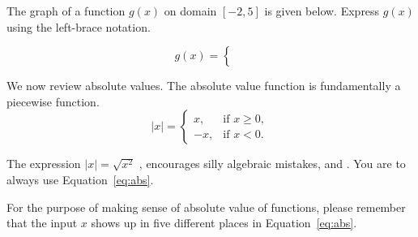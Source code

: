 \documentclass[../main.tex]{subfiles}
\begin{document}
\begin{exercise}
  The graph of a function \(g(x)\) on domain \([-2,5]\) is given below. Express \(g(x)\) using the left-brace notation.

  \begin{minipage}{3in}
  \end{minipage}
  \begin{minipage}{2in}
    \[
      g(x) = 
      \begin{cases}
        \phantom{a} \\[10ex]
        \phantom{a}
      \end{cases}
    \]
  \end{minipage}
\end{exercise}

\clearpage

We now review absolute values. The absolute value function is fundamentally a piecewise function.
\begin{equation} \label{eq:abs}
  |x| = 
  \begin{cases}
    x, &\text{if } x \ge 0, \\
    -x, &\text{if } x < 0.
  \end{cases}
\end{equation}

\faExclamationTriangle{} The expression \(|x| = \sqrt{x^{2}}\) , encourages silly algebraic mistakes, and .  You are  to always use Equation~\eqref{eq:abs}.  

For the purpose of making sense of absolute value of functions, please remember that the input \(x\) shows up in five different places in Equation~\eqref{eq:abs}.  
\end{document}
